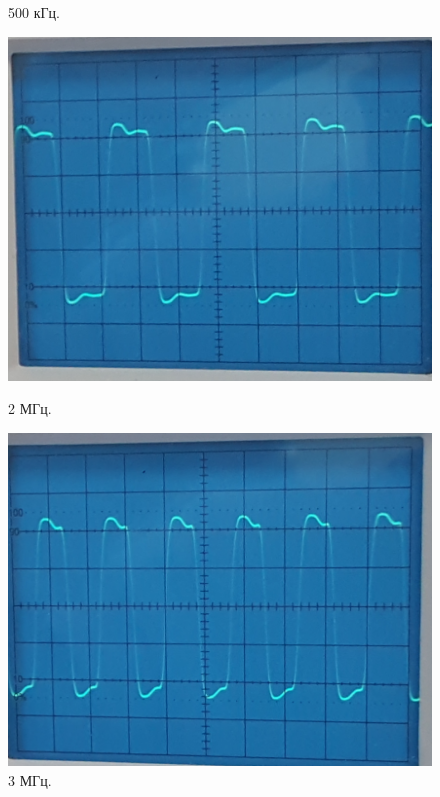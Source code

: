 \documentclass[12pt,a4paper]{article}
\begin{document}
\begin{figure}[h!]
\begin{center}
\begin{minipage}[h]{0.32\linewidth}
				\caption{500 кГц.}
				\label{ris:meandr_500kHz}
			\end{minipage}
		\hfill
			\begin{minipage}[h]{0.32\linewidth}
				\includegraphics[width=1\linewidth]{meandr_2MHz}
				\caption{2 МГц.} %
				\label{ris:meandr_2MHz} %
			\end{minipage}
		\hfill
			\begin{minipage}[h]{0.32\linewidth}
				\includegraphics[width=1\linewidth]{meandr_3MHz}
				\caption{3 МГц.}
				\label{ris:meandr_3MHz}
			\end{minipage}

\end{center}
\end{figure}
\end{document}
